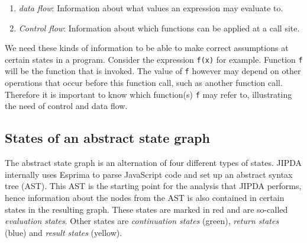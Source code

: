 \begin{enumerate}
\item \textit{data flow}: Information about what values an expression may evaluate to.
\item \textit{Control flow}: Information about which functions can be applied at a call site.
\end{enumerate}

We need these kinds of information to be able to make correct assumptions at certain states in a program. Consider the expression \texttt{f(x)} for example. Function \texttt{f} will be the function that is invoked. The value of \texttt{f} however may depend on other operations that occur before this function call, such as another function call. Therefore it is important to know which function(s) \texttt{f} may refer to, illustrating the need of control and data flow.

\subsection*{States of an abstract state graph}

The abstract state graph is an alternation of four different types of states. JIPDA internally uses Esprima\cite{Esprima} to parse JavaScript code and set up an abstract syntax tree (AST). This AST is the starting point for the analysis that JIPDA performs, hence information about the nodes from the AST is also contained in certain states in the resulting graph. These states are marked in red and are so-called \textit{evaluation states}. Other states are \textit{continuation states} (green), \textit{return states} (blue) and \textit{result states} (yellow).

